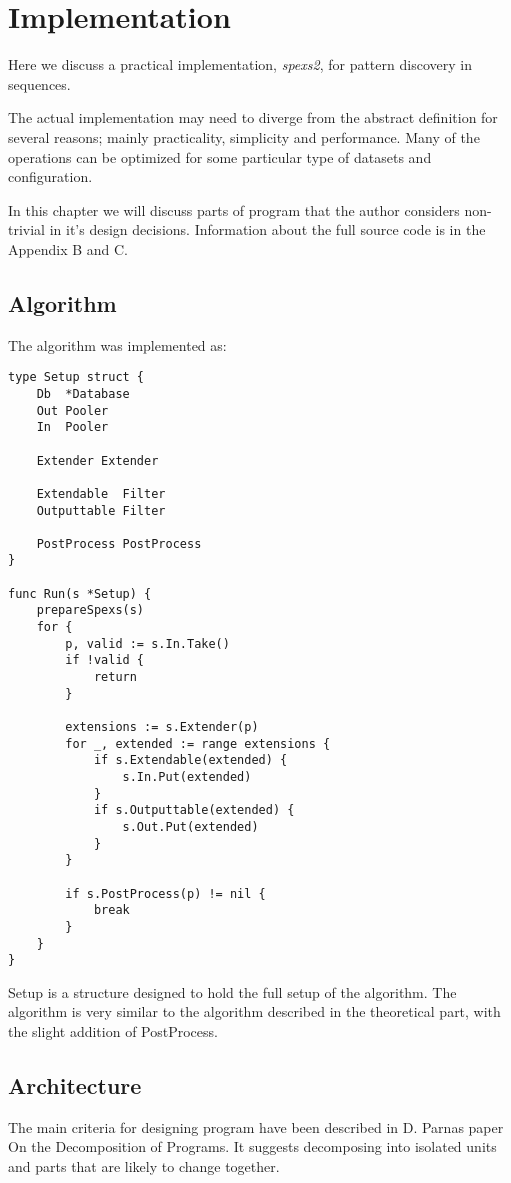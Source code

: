 \chapter{Implementation}

Here we discuss a practical implementation, \emph{spexs2}, for
pattern discovery in sequences.

The actual implementation may need to diverge from the abstract
definition for several reasons; mainly practicality, simplicity and
performance. Many of the operations can be optimized for some 
particular type of datasets and configuration.

In this chapter we will discuss parts of program that the author
considers non-trivial in it's design decisions. Information about 
the full source code is in the Appendix B and C.

\section{Algorithm}

The algorithm was implemented as:

\begin{verbatim}
type Setup struct {
	Db  *Database
	Out Pooler
	In  Pooler

	Extender Extender

	Extendable  Filter
	Outputtable Filter

	PostProcess PostProcess
}

func Run(s *Setup) {
	prepareSpexs(s)
	for {
		p, valid := s.In.Take()
		if !valid {
			return
		}

		extensions := s.Extender(p)
		for _, extended := range extensions {
			if s.Extendable(extended) {
				s.In.Put(extended)
			}
			if s.Outputtable(extended) {
				s.Out.Put(extended)
			}
		}

		if s.PostProcess(p) != nil {
			break
		}
	}
}
\end{verbatim}

Setup is a structure designed to hold the full setup of the algorithm.
The algorithm is very similar to the algorithm described in the theoretical
part, with the slight addition of PostProcess.

\section{Architecture}

The main criteria for designing program have been described in D. Parnas
paper On the Decomposition of Programs. It suggests decomposing into
isolated units and parts that are likely to change together. \cite{Parnas72}

